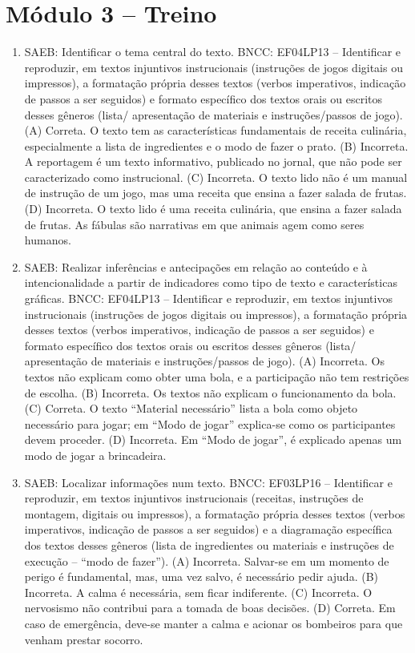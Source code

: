 \section*{Módulo 3 – Treino}

\begin{enumerate}
\item
SAEB: Identificar o tema central do texto.
BNCC: EF04LP13 -- Identificar e reproduzir, em textos injuntivos
instrucionais (instruções de jogos digitais ou impressos), a formatação
própria desses textos (verbos imperativos, indicação de passos a ser
seguidos) e formato específico dos textos orais ou escritos desses
gêneros (lista/ apresentação de materiais e instruções/passos de jogo).
(A) Correta. O texto tem as características fundamentais de receita
culinária, especialmente a lista de ingredientes e o modo de fazer o prato.
(B) Incorreta. A reportagem é um texto informativo, publicado no jornal, 
que não pode ser caracterizado como instrucional.
(C) Incorreta. O texto lido não é um manual de instrução de um jogo, mas
uma receita que ensina a fazer salada de frutas.  
(D) Incorreta. O texto lido é uma receita culinária, que ensina a fazer 
salada de frutas. As fábulas são narrativas em que animais agem como seres
humanos.

\item
SAEB: Realizar inferências e antecipações em relação ao conteúdo e
à intencionalidade a partir de indicadores como tipo de texto e
características gráficas.
BNCC: EF04LP13 -- Identificar e reproduzir, em textos injuntivos
instrucionais (instruções de jogos digitais ou impressos), a formatação
própria desses textos (verbos imperativos, indicação de passos a ser
seguidos) e formato específico dos textos orais ou escritos desses
gêneros (lista/ apresentação de materiais e instruções/passos de jogo).
(A) Incorreta. Os textos não explicam como obter uma bola, e a 
participação não tem restrições de escolha.  
(B) Incorreta. Os textos não explicam o funcionamento da bola.
(C) Correta. O texto ``Material necessário'' lista a bola como objeto 
necessário para jogar; em ``Modo de jogar'' explica-se como os 
participantes devem proceder.
(D) Incorreta. Em ``Modo de jogar'', é explicado apenas um modo de jogar
a brincadeira.

\item
SAEB: Localizar informações num texto.
BNCC: EF03LP16 -- Identificar e reproduzir, em textos injuntivos
instrucionais (receitas, instruções de montagem, digitais ou impressos),
a formatação própria desses textos (verbos imperativos, indicação de
passos a ser seguidos) e a diagramação específica dos textos desses
gêneros (lista de ingredientes ou materiais e instruções de execução --
``modo de fazer'').
(A) Incorreta. Salvar-se em um momento de perigo é fundamental, mas, uma vez salvo, é necessário pedir ajuda. 
(B) Incorreta. A calma é necessária, sem ficar indiferente.
(C) Incorreta. O nervosismo não contribui para a tomada de boas decisões.
(D) Correta. Em caso de emergência, deve-se manter a calma e acionar os bombeiros para que venham prestar socorro.  
\end{enumerate}

